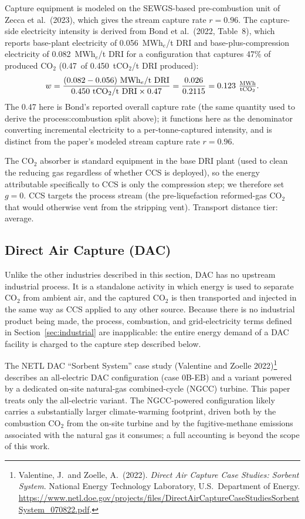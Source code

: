 \documentclass[11pt]{article}
\newcommand{\cotwo}{\ensuremath{\mathrm{CO_2}}}
\begin{document}
Capture equipment is modeled on the SEWGS-based pre-combustion unit of Zecca et al.\ (2023), which gives the stream capture rate $r = 0.96$. The capture-side electricity intensity is derived from Bond et al.\ (2022, Table~8), which reports base-plant electricity of 0.056~MWh$_e$/t DRI and base-plus-compression electricity of 0.082~MWh$_e$/t DRI for a configuration that captures 47\% of produced \cotwo{} (0.47~of 0.450~t\cotwo{}/t DRI produced):
%
\[
  w = \frac{(0.082 - 0.056)~\text{MWh}_e/\text{t DRI}}{0.450~\text{t\cotwo{}/t DRI} \times 0.47} = \frac{0.026}{0.2115} = 0.123~\tfrac{\text{MWh}}{\text{t\cotwo{}}}.
\]
%
The 0.47 here is Bond's reported overall capture rate (the same quantity used to derive the process:combustion split above); it functions here as the denominator converting incremental electricity to a per-tonne-captured intensity, and is distinct from the paper's modeled stream capture rate $r = 0.96$.

The \cotwo{} absorber is standard equipment in the base DRI plant (used to clean the reducing gas regardless of whether CCS is deployed), so the energy attributable specifically to CCS is only the compression step; we therefore set $g = 0$. CCS targets the process stream (the pre-liquefaction reformed-gas \cotwo{} that would otherwise vent from the stripping vent). Transport distance tier: average.

\subsection{Direct Air Capture (DAC)}
\label{sec:const_dac}

Unlike the other industries described in this section, DAC has no upstream industrial process. It is a standalone activity in which energy is used to separate \cotwo{} from ambient air, and the captured \cotwo{} is then transported and injected in the same way as CCS applied to any other source. Because there is no industrial product being made, the process, combustion, and grid-electricity terms defined in Section~\ref{sec:industrial} are inapplicable: the entire energy demand of a DAC facility is charged to the capture step described below.

The NETL DAC ``Sorbent System'' case study (Valentine and Zoelle 2022)\footnote{Valentine, J.\ and Zoelle, A.\ (2022). \emph{Direct Air Capture Case Studies: Sorbent System}. National Energy Technology Laboratory, U.S.\ Department of Energy. \url{https://www.netl.doe.gov/projects/files/DirectAirCaptureCaseStudiesSorbentSystem_070822.pdf}.} describes an all-electric DAC configuration (case 0B-EB) and a variant powered by a dedicated on-site natural-gas combined-cycle (NGCC) turbine. This paper treats only the all-electric variant. The NGCC-powered configuration likely carries a substantially larger climate-warming footprint, driven both by the combustion \cotwo{} from the on-site turbine and by the fugitive-methane emissions associated with the natural gas it consumes; a full accounting is beyond the scope of this work.
\end{document}
